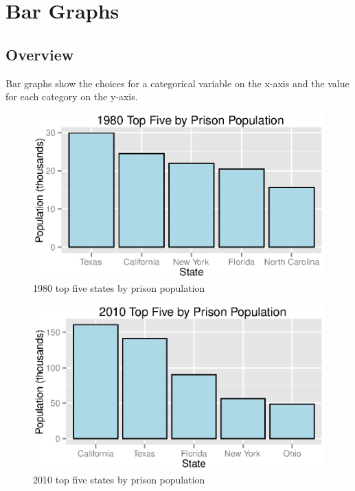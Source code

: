 \documentclass{exam}
\begin{document}
  \section{Bar Graphs}

  \subsection{Overview}
  Bar graphs show the choices for a categorical variable on the x-axis and the value for each category on the y-axis.

  \begin{figure}[H]
    \centering
    \includegraphics[scale = 0.9]{figures/top_five_1980.eps}
    \caption{1980 top five states by prison population}
  \end{figure}

  \begin{figure}[H]
    \centering
    \includegraphics[scale = 0.9]{figures/top_five_2010.eps}
    \caption{2010 top five states by prison population}
  \end{figure}
\end{document}
